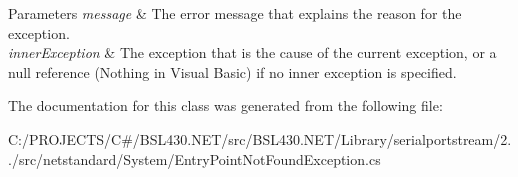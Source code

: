 \begin{DoxyParams}{Parameters}
{\em message} & The error message that explains the reason for the exception.\\
\hline
{\em inner\+Exception} & The exception that is the cause of the current exception, or a null reference (Nothing in Visual Basic) if no inner exception is specified.\\
\hline
\end{DoxyParams}


The documentation for this class was generated from the following file\+:\begin{DoxyCompactItemize}
\item 
C\+:/\+P\+R\+O\+J\+E\+C\+T\+S/\+C\#/\+B\+S\+L430.\+N\+E\+T/src/\+B\+S\+L430.\+N\+E\+T/\+Library/serialportstream/2../src/netstandard/\+System/Entry\+Point\+Not\+Found\+Exception.\+cs\end{DoxyCompactItemize}
